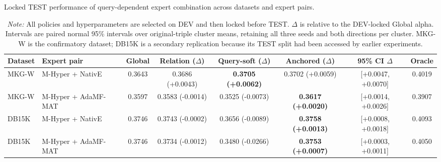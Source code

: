 \begin{table}[t]
\centering
\small
\caption{Locked TEST performance of query-dependent expert combination across datasets and expert pairs.}
\label{tab:anchored_dynamic_test_main}
\setlength{\tabcolsep}{4pt}
\begin{tabular}{llcccccc}
\toprule
Dataset & Expert pair & Global & Relation ($\Delta$) & Query-soft ($\Delta$) & Anchored ($\Delta$) & 95\% CI $\Delta$ & Oracle \\
\midrule
MKG-W & M-Hyper + NativE & 0.3643 & 0.3686 (+0.0043) & \textbf{0.3705 (+0.0062)} & 0.3702 (+0.0059) & [+0.0047, +0.0070] & 0.4019 \\
MKG-W & M-Hyper + AdaMF-MAT & 0.3597 & 0.3583 (-0.0014) & 0.3525 (-0.0073) & \textbf{0.3617 (+0.0020)} & [+0.0014, +0.0026] & 0.3907 \\
\midrule
DB15K & M-Hyper + NativE & 0.3746 & 0.3743 (-0.0002) & 0.3656 (-0.0089) & \textbf{0.3758 (+0.0013)} & [+0.0008, +0.0018] & 0.4093 \\
DB15K & M-Hyper + AdaMF-MAT & 0.3746 & 0.3734 (-0.0012) & 0.3480 (-0.0266) & \textbf{0.3753 (+0.0007)} & [+0.0003, +0.0011] & 0.4050 \\
\bottomrule
\end{tabular}
\vspace{0.4ex}
\caption*{\footnotesize \textit{Note:} All policies and hyperparameters are selected on DEV and then locked before TEST. $\Delta$ is relative to the DEV-locked Global alpha. Intervals are paired normal 95\% intervals over original-triple cluster means, retaining all three seeds and both directions per cluster. MKG-W is the confirmatory dataset; DB15K is a secondary replication because its TEST split had been accessed by earlier experiments.}
\end{table}
